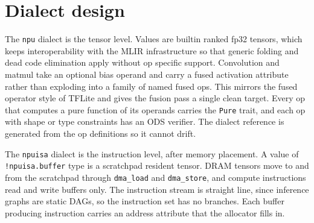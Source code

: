 \section{Dialect design}

The \texttt{npu} dialect is the tensor level. Values are builtin ranked fp32
tensors, which keeps interoperability with the MLIR infrastructure so that generic
folding and dead code elimination apply without op specific support. Convolution
and matmul take an optional bias operand and carry a fused activation attribute
rather than exploding into a family of named fused ops. This mirrors the fused
operator style of TFLite and gives the fusion pass a single clean target. Every op
that computes a pure function of its operands carries the \texttt{Pure} trait, and
each op with shape or type constraints has an ODS verifier. The dialect reference
is generated from the op definitions so it cannot drift.

The \texttt{npuisa} dialect is the instruction level, after memory placement. A
value of \texttt{!npuisa.buffer} type is a scratchpad resident tensor. DRAM
tensors move to and from the scratchpad through \texttt{dma\_load} and
\texttt{dma\_store}, and compute instructions read and write buffers only. The
instruction stream is straight line, since inference graphs are static DAGs, so
the instruction set has no branches. Each buffer producing instruction carries an
address attribute that the allocator fills in.
